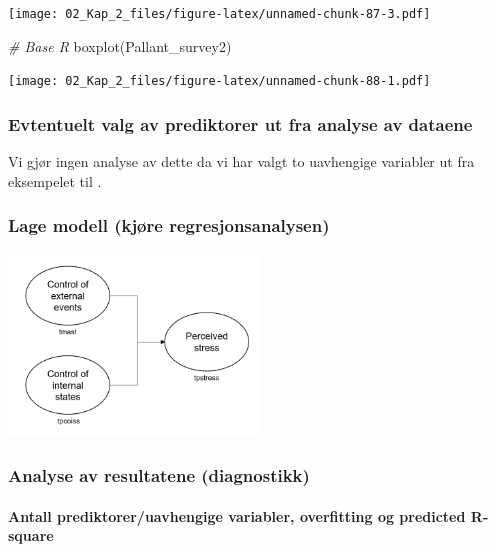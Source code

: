 \documentclass[
]{article}
\newenvironment{Shaded}{\begin{snugshade}}{\end{snugshade}}
\newcommand{\CommentTok}[1]{\textcolor[rgb]{0.56,0.35,0.01}{\textit{#1}}}
\newcommand{\FunctionTok}[1]{\textcolor[rgb]{0.00,0.00,0.00}{#1}}
\newcommand{\NormalTok}[1]{#1}
\begin{document}
\texttt{[image: 02\_Kap\_2\_files/figure-latex/unnamed-chunk-87-3.pdf]}

\begin{Shaded}
\begin{Highlighting}[]
\CommentTok{\# Base R}
\FunctionTok{boxplot}\NormalTok{(Pallant\_survey2)}
\end{Highlighting}
\end{Shaded}

\texttt{[image: 02\_Kap\_2\_files/figure-latex/unnamed-chunk-88-1.pdf]}

\hypertarget{evtentuelt-valg-av-prediktorer-ut-fra-analyse-av-dataene}{%
\subsubsection{Evtentuelt valg av prediktorer ut fra analyse av dataene}\label{evtentuelt-valg-av-prediktorer-ut-fra-analyse-av-dataene}}

Vi gjør ingen analyse av dette da vi har valgt to uavhengige variabler ut fra eksempelet til \citet{pallantSPSSSurvivalManual2010}.

\hypertarget{lage-modell-kjuxf8re-regresjonsanalysen}{%
\subsubsection{Lage modell (kjøre regresjonsanalysen)}\label{lage-modell-kjuxf8re-regresjonsanalysen}}

\includegraphics[width=0.5\textwidth,height=\textheight]{PallantOLS.png}

\hypertarget{analyse-av-resultatene-diagnostikk}{%
\subsubsection{Analyse av resultatene (diagnostikk)}\label{analyse-av-resultatene-diagnostikk}}

\hypertarget{antall-prediktoreruavhengige-variabler-overfitting-og-predicted-r-square}{%
\paragraph{Antall prediktorer/uavhengige variabler, overfitting og predicted R-square}\label{antall-prediktoreruavhengige-variabler-overfitting-og-predicted-r-square}}
\end{document}
